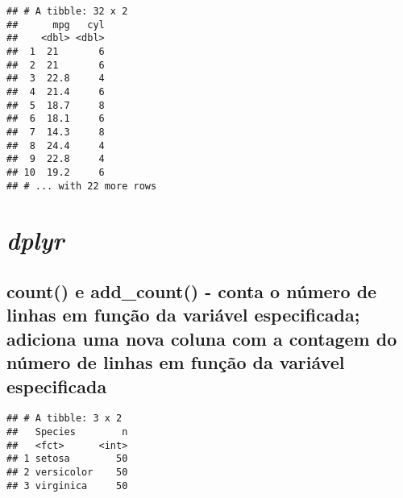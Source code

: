 \documentclass[]{book}
\newenvironment{Shaded}{\begin{snugshade}}{\end{snugshade}}
\newcommand{\KeywordTok}[1]{\textcolor[rgb]{0.13,0.29,0.53}{\textbf{#1}}}
\newcommand{\NormalTok}[1]{#1}
\newcommand{\OperatorTok}[1]{\textcolor[rgb]{0.81,0.36,0.00}{\textbf{#1}}}
\newcommand{\StringTok}[1]{\textcolor[rgb]{0.31,0.60,0.02}{#1}}
\begin{document}
\begin{verbatim}
## # A tibble: 32 x 2
##      mpg   cyl
##    <dbl> <dbl>
##  1  21       6
##  2  21       6
##  3  22.8     4
##  4  21.4     6
##  5  18.7     8
##  6  18.1     6
##  7  14.3     8
##  8  24.4     4
##  9  22.8     4
## 10  19.2     6
## # ... with 22 more rows
\end{verbatim}

\hypertarget{dplyr}{%
\chapter{\texorpdfstring{\emph{dplyr}}{dplyr}}\label{dplyr}}

\hypertarget{count-e-add_count---conta-o-nuxfamero-de-linhas-em-funuxe7uxe3o-da-variuxe1vel-especificada-adiciona-uma-nova-coluna-com-a-contagem-do-nuxfamero-de-linhas-em-funuxe7uxe3o-da-variuxe1vel-especificada}{%
\section{count() e add\_count() - conta o número de linhas em função da variável especificada; adiciona uma nova coluna com a contagem do número de linhas em função da variável especificada}\label{count-e-add_count---conta-o-nuxfamero-de-linhas-em-funuxe7uxe3o-da-variuxe1vel-especificada-adiciona-uma-nova-coluna-com-a-contagem-do-nuxfamero-de-linhas-em-funuxe7uxe3o-da-variuxe1vel-especificada}}

\begin{Shaded}
\end{Shaded}

\begin{verbatim}
## # A tibble: 3 x 2
##   Species        n
##   <fct>      <int>
## 1 setosa        50
## 2 versicolor    50
## 3 virginica     50
\end{verbatim}

\begin{Shaded}
\end{Shaded}
\end{document}

